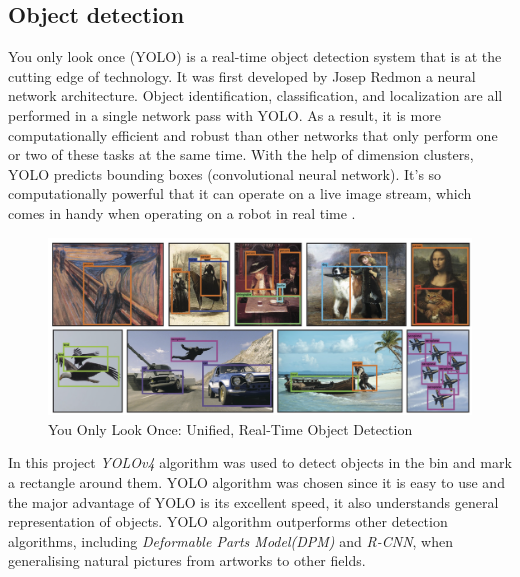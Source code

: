 \subsection{Object detection}


You only look once (YOLO) is a real-time object detection system that is at the cutting edge of technology. 
It was first developed by Josep Redmon a neural network architecture.
Object identification, classification, and localization are all performed in a single network pass with YOLO. 
As a result, it is more computationally efficient and robust than other networks that only perform one or two of these tasks at the same time. 
With the help of dimension clusters, YOLO predicts bounding boxes (convolutional neural network). 
It's so computationally powerful that it can operate on a live image stream, which comes in handy when operating on a robot in real time \cite{redmon_yolov3_2018}.
\begin{figure} [ht]
    \centering
    \includegraphics[width = 0.75 \textwidth]{graphics/yolo.PNG}
    \caption{You Only Look Once: Unified, Real-Time Object Detection \cite{redmon_you_2016}}
    \label{fig:yolo}
\end{figure}


In this project \textit{YOLOv4}\cite{bochkovskiy_yolov4_2020} algorithm was used to detect objects in the bin and mark a rectangle around them. 
YOLO algorithm was chosen since it is easy to use and the major advantage of YOLO is its excellent speed, it also understands general representation of objects. YOLO algorithm outperforms other detection algorithms, including \textit{Deformable Parts Model(DPM)} and \textit{R-CNN}, when generalising natural pictures from artworks to other fields.



